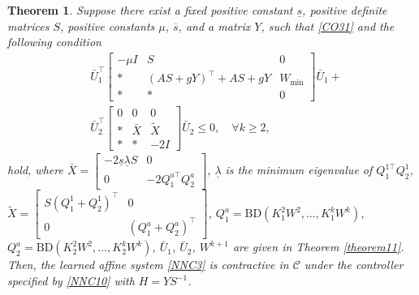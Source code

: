 \documentclass[journal,twoside,web]{ieeecolor}
\newtheorem{theorem}            {Theorem}[section]
\newcommand{\bbm}[1]{\left[\begin{matrix} #1 \end{matrix}\right]}
\begin{document}
\begin{theorem}\label{theorem3}
Suppose there exist a fixed positive constant $\underline{s}$, positive definite matrices $S$, positive constants $\mu$,  $\overline{s}$, and a matrix $Y$, such that \eqref{CO31} and the following condition
\begin{equation}\label{TH32}
\begin{aligned}
&\bar{U}_1^\top
\bbm{
-\mu I & S & 0 \\
\ast &  (AS+gY)^\top + AS + gY & W_{\min} \\
\ast & \ast & 0
}
\bar{U}_1 + \\
&\bar{U}_2^\top
\bbm{
0 & 0 & 0 \\
\ast & \bar{X} &\tilde{X} \\
\ast & \ast & -2I
}
\bar{U}_2 \leq 0, \quad \forall k \geq 2, 
\end{aligned}
\end{equation}
hold, where $\bar{X}=\bbm{-2\underline{s} \underline{\lambda}S&0\\0&-2Q^{a\top}_1 Q^a_2}$, $\underline{\lambda}$ is the minimum eigenvalue of $Q^{1\top}_1 Q^1_2$,  $\tilde{X}=\bbm{S(Q^1_1+Q^1_2)^\top&0\\0&(Q^a_1+Q^a_2)^\top}$, $Q^a_1=\mathrm{BD}(K_1^2W^2, \dots, K_1^{k}W^{k})$, $Q^a_2=\mathrm{BD}(K_2^2W^2, \dots, K_2^{k}W^{k})$, $\bar{U}_1$, $\bar{U}_2$, $W^{k+1}$ are given in Theorem \ref{theorem11}. Then, the learned affine system \eqref{NNC3} is contractive in $\mathcal{C}$ under the controller specified by \eqref{NNC10} with $H=YS^{-1}$.
\end{theorem}
\end{document}

